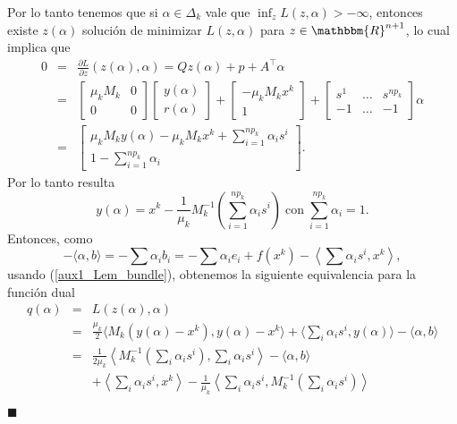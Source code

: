 \documentclass[a4paper,12pt]{report}
\newcommand{\la}{\langle}
\newcommand{\ra}{\rangle}
\newcommand{\lla}{\left\la}
\newcommand{\rra}{\right\ra}
\newcommand{\RR}{\mathbbm{R}}
\newenvironment{dem}{\vspace*{-0.1cm}{\it Demostraci\'on:}}{\hfill
$\blacksquare$\\}
\begin{document}
\begin{dem}
Por lo tanto tenemos que si $\alpha\in\Delta_k$ vale que $\inf_{z}L(z,\alpha)>-\infty$, entonces existe $z(\alpha)$ soluci\'on de minimizar $L(z,\alpha)$ para $z\in\RR^{n+1}$, lo cual implica que
\begin{eqnarray*}
0&=&\frac{\partial L}{\partial z}(z(\alpha),\alpha)=Qz(\alpha)+p+A^\top\alpha\\
&=&
\left[
\begin{array}{cc}
\mu_k M_k & 0\\
0 & 0 
\end{array}
\right]
\left[
\begin{array}{cc}
y(\alpha)\\
r(\alpha)
\end{array}
\right]+
\left[
\begin{array}{cc}
-\mu_k M_k x^k\\
1
\end{array}
\right]+
\left[
\begin{array}{ccc}
s^1&\dots&s^{np_k}\\
-1&\dots&-1
\end{array}
\right]\alpha\\
&=&
\left[
\begin{array}{cc}
\mu_k M_k y(\alpha)-\mu_k M_k x^k+\sum_{i=1}^{np_k}\alpha_i s^i\\
1-\sum_{i=1}^{np_k}\alpha_i
\end{array}
\right].
\end{eqnarray*}
Por lo tanto resulta
\begin{equation}\label{problema3}
y(\alpha)=x^k-\frac{1}{\mu_k}M_{k}^{-1}\left(\sum_{i=1}^{np_k}\alpha_i s^i\right)\;\mbox{con}\;\sum_{i=1}^{np_k}\alpha_i=1.
\end{equation}
Entonces, como
$$\textstyle-\la\alpha,b\ra=-\sum \alpha_i b_i=-\sum \alpha_i e_i+f(x^k)-\lla\sum\alpha_i s^i,x^k\rra,$$
usando (\ref{aux1_Lem_bundle}), obtenemos la siguiente equivalencia para la funci\'on dual
\begin{eqnarray*}
 q(\alpha)&=&L(z(\alpha),\alpha)\\
&=&\frac{\mu_k}{2}\la M_k (y(\alpha)-x^k),y(\alpha)-x^k\ra+{\textstyle\la\sum_{i}\alpha_i s^i,y(\alpha) \ra} -\la\alpha,b\ra\\
&=&\textstyle\frac{1}{2\mu_k}\left\la M_k^{-1}\left(\sum_{i} \alpha_i s^i\right),\sum_{i}\alpha_i s^i\right\ra -\la\alpha,b\ra\\
&&\textstyle+ \lla \sum_i \alpha_i s^i,x^k\rra-\frac{1}{\mu_k}\lla \sum_i \alpha_i s^i,M_k^{-1}\left(\sum_i \alpha_i s^i\right)\rra\\

\end{eqnarray*}
\end{dem}
\end{document}
